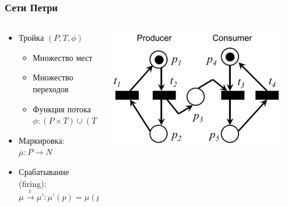 \documentclass{../mcsslides}
\begin{document}
    \begin{frame}
        \frametitle{Сети Петри}
        \begin{columns}
            \begin{column}{0.6\textwidth}
                \begin{itemize}
                    \item Тройка $(P, T, \phi)$
                    \begin{itemize}
                        \item Множество мест
                        \item Множество переходов
                        \item Функция потока $\phi : (P \times T) \cup (T \times P) \rightarrow N$
                    \end{itemize}
                    \item Маркировка: $\mu : P \rightarrow N$
                    \item Срабатывание (firing):
                    $\mu \xrightarrow{t} \mu’ : \mu’(p) = \mu(p) - \phi(p, t) + \phi(t, p), \forall p \in P$
                \end{itemize}
            \end{column}
            \begin{column}{0.4\textwidth}
                \begin{center}
                    \includegraphics[width=0.9\textwidth]{petri.png}
                \end{center}
            \end{column}
        \end{columns}
    \end{frame}
\end{document}
